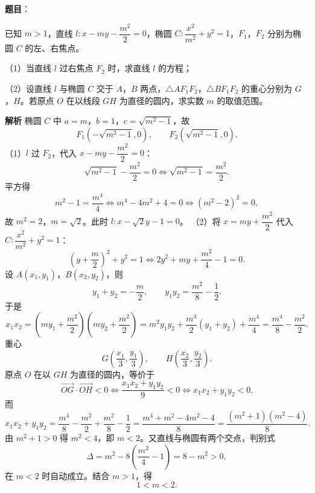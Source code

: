 \begin{answer}

\textbf{题目}：

已知 $m>1$，直线 $l:x-my-\dfrac{m^2}{2}=0$，椭圆 $C:\dfrac{x^2}{m^2}+y^2=1$，$F_1$，$F_2$ 分别为椭圆 $C$ 的左、右焦点。

（1）当直线 $l$ 过右焦点 $F_2$ 时，求直线 $l$ 的方程；

（2）设直线 $l$ 与椭圆 $C$ 交于 $A$，$B$ 两点，$\triangle AF_1F_2$，$\triangle BF_1F_2$ 的重心分别为 $G$，$H$。若原点 $O$ 在以线段 $GH$ 为直径的圆内，求实数 $m$ 的取值范围。
\nopagebreak[4]
\begin{center}\end{center}
\nopagebreak[4]
\textbf{解析}
椭圆 $C$ 中 $a=m$，$b=1$，$c=\sqrt{m^2-1}$，故
\nopagebreak[4]
\[F_1\left(-\sqrt{m^2-1},0\right),\qquad F_2\left(\sqrt{m^2-1},0\right).\]
（1）$l$ 过 $F_2$，代入 $x-my-\dfrac{m^2}2=0$：
\nopagebreak[4]
\[\sqrt{m^2-1}-\frac{m^2}2=0\iff\sqrt{m^2-1}=\frac{m^2}2.\]
平方得
\nopagebreak[4]
\[m^2-1=\frac{m^4}4\iff m^4-4m^2+4=0\iff(m^2-2)^2=0,\]
故 $m^2=2$，$m=\sqrt2$。此时 $l:x-\sqrt2y-1=0$。
（2）将 $x=my+\dfrac{m^2}2$ 代入 $C:\dfrac{x^2}{m^2}+y^2=1$：
\nopagebreak[4]
\[\left(y+\frac m2\right)^2+y^2=1\iff2y^2+my+\frac{m^2}4-1=0.\]
设 $A(x_1,y_1)$，$B(x_2,y_2)$，则
\nopagebreak[4]
\[y_1+y_2=-\frac m2,\qquad y_1y_2=\frac{m^2}8-\frac12.\]
于是
\nopagebreak[4]
\[x_1x_2=\left(my_1+\frac{m^2}2\right)\left(my_2+\frac{m^2}2\right)
=m^2y_1y_2+\frac{m^3}2(y_1+y_2)+\frac{m^4}4
=\frac{m^4}8-\frac{m^2}2.\]
重心
\nopagebreak[4]
\[G\left(\frac{x_1}3,\frac{y_1}3\right),\qquad H\left(\frac{x_2}3,\frac{y_2}3\right).\]
原点 $O$ 在以 $GH$ 为直径的圆内，等价于
\nopagebreak[4]
\[\overrightarrow{OG}\cdot\overrightarrow{OH}<0
\iff\frac{x_1x_2+y_1y_2}9<0\iff x_1x_2+y_1y_2<0.\]
而
\nopagebreak[4]
\[x_1x_2+y_1y_2=\frac{m^4}8-\frac{m^2}2+\frac{m^2}8-\frac12
=\frac{m^4+m^2-4m^2-4}8
=\frac{(m^2+1)(m^2-4)}8.\]
由 $m^2+1>0$ 得 $m^2<4$，即 $m<2$。又直线与椭圆有两个交点，判别式
\nopagebreak[4]
\[\Delta=m^2-8\left(\frac{m^2}4-1\right)=8-m^2>0,\]
在 $m<2$ 时自动成立。结合 $m>1$，得
\nopagebreak[4]
\[1<m<2.\]


\end{answer}
